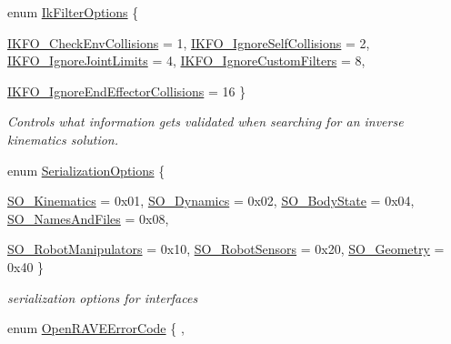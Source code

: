\begin{DoxyCompactItemize}
enum \hyperlink{namespaceOpenRAVE_a89401ff7c557d6d1ede96b550fb22bdc}{IkFilterOptions} \{ \par
\hyperlink{namespaceOpenRAVE_a89401ff7c557d6d1ede96b550fb22bdca9e6c06d6ccbfbbe56de480a37cf0381b}{IKFO\_\-CheckEnvCollisions} = 1, 
\hyperlink{namespaceOpenRAVE_a89401ff7c557d6d1ede96b550fb22bdca1bc83e529a1beb8fc6c7cb59fa477166}{IKFO\_\-IgnoreSelfCollisions} = 2, 
\hyperlink{namespaceOpenRAVE_a89401ff7c557d6d1ede96b550fb22bdcad66d86a301f3ccd5d17bcc1197f9c321}{IKFO\_\-IgnoreJointLimits} = 4, 
\hyperlink{namespaceOpenRAVE_a89401ff7c557d6d1ede96b550fb22bdcaf98c0e29d2aee38b7af964e15a43ff3b}{IKFO\_\-IgnoreCustomFilters} = 8, 
\par
\hyperlink{namespaceOpenRAVE_a89401ff7c557d6d1ede96b550fb22bdcab6c6760e71911d36d392c861002e2a6c}{IKFO\_\-IgnoreEndEffectorCollisions} = 16
 \}
\begin{DoxyCompactList}\small\item\em Controls what information gets validated when searching for an inverse kinematics solution. \item\end{DoxyCompactList}\item 
enum \hyperlink{namespaceOpenRAVE_a93a1dd60e5da7bb4710cc7ca1e041d88}{SerializationOptions} \{ \par
\hyperlink{namespaceOpenRAVE_a93a1dd60e5da7bb4710cc7ca1e041d88a4f89b08487512e4239c8c8936f7c2de4}{SO\_\-Kinematics} =  0x01, 
\hyperlink{namespaceOpenRAVE_a93a1dd60e5da7bb4710cc7ca1e041d88afa503c3acf6b50e3c292bee576395ff0}{SO\_\-Dynamics} =  0x02, 
\hyperlink{namespaceOpenRAVE_a93a1dd60e5da7bb4710cc7ca1e041d88a78580517a26880616f5b1c6fcfdb0945}{SO\_\-BodyState} =  0x04, 
\hyperlink{namespaceOpenRAVE_a93a1dd60e5da7bb4710cc7ca1e041d88a7517f05542512917f3fe40abff6adb10}{SO\_\-NamesAndFiles} =  0x08, 
\par
\hyperlink{namespaceOpenRAVE_a93a1dd60e5da7bb4710cc7ca1e041d88aeb7e387f766567c9ced7e93677fb30a3}{SO\_\-RobotManipulators} =  0x10, 
\hyperlink{namespaceOpenRAVE_a93a1dd60e5da7bb4710cc7ca1e041d88ac7670ed300cd49644318eaf3580585df}{SO\_\-RobotSensors} =  0x20, 
\hyperlink{namespaceOpenRAVE_a93a1dd60e5da7bb4710cc7ca1e041d88ab81e3effdc7d19a9da6cb868a564abeb}{SO\_\-Geometry} =  0x40
 \}
\begin{DoxyCompactList}\small\item\em serialization options for interfaces \item\end{DoxyCompactList}\item 
enum \hyperlink{namespaceOpenRAVE_adf2fa050995e80f643f8eddc14d7262c}{OpenRAVEErrorCode} \{ , \par

\end{DoxyCompactItemize}
